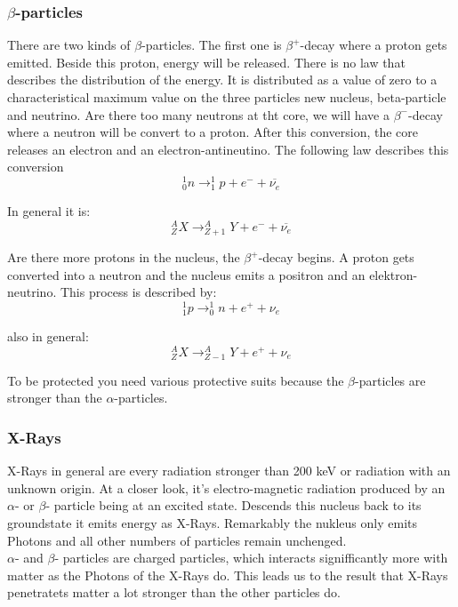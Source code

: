 	\subsubsection*{$\beta$-particles}
There are two kinds of $\beta$-particles. The first one is $\beta^{+}$-decay where a proton gets emitted. Beside this proton, energy will be released. There is no law that describes the distribution of the energy. It is distributed as a value of zero to a characteristical maximum value on the three particles new nucleus, beta-particle and neutrino. 
Are there too many neutrons at tht core, we will have a $\beta^{-}$-decay where a neutron will be convert to a proton. After this conversion, the core releases an electron and an electron-antineutino. The following law describes this conversion
	\begin{equation}
	^{1}_{0}n \rightarrow ^{1}_{1}p + e^{-} + \overline{\nu_{e}}
	\end{equation}

In general it is:
	\begin{equation}
	^{A}_{Z}X \rightarrow ^{A}_{Z+1}Y + e^{-} + \overline{\nu_{e}}
	\end{equation}

Are there more protons in the nucleus, the $\beta^{+}$-decay begins. A proton gets converted into a neutron and the nucleus emits a positron and an elektron-neutrino. This process is described by:
	\begin{equation}
	^{1}_{1}p \rightarrow ^{1}_{0}n + e^{+} + \nu_{e}
	\end{equation}

also in general:
	\begin{equation}
	^{A}_{Z}X \rightarrow ^{A}_{Z-1}Y + e^{+} + \nu_{e}
	\end{equation}

To be protected you need various protective suits because the $\beta$-particles are stronger than the $\alpha$-particles.

	\subsubsection*{X-Rays}
	X-Rays in general are every radiation stronger than 200 keV or radiation with an unknown origin. At a closer look, it's electro-magnetic radiation produced by an $\alpha$- or $\beta$- particle being at an excited state. Descends this nucleus back to its groundstate it emits energy as X-Rays. Remarkably the nukleus only emits Photons and all other numbers of particles remain unchenged.
\\
	$\alpha$- and $\beta$- particles are charged particles, which interacts signifficantly more with matter as the Photons of the X-Rays do. This leads us to the result that X-Rays penetratets matter a lot stronger than the other particles do.

